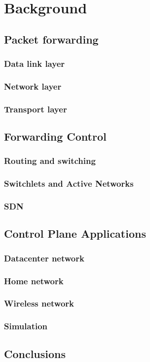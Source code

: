 \chapter{Background} \label{ch:background}
\ifpdf
    \graphicspath{{Background/BackgroundFigs/PNG/}{Chapter3/BackgroundFigs/PDF/}{Background/BackgroundFigs/}}
\else
    \graphicspath{{Background/BackgroundFigs/EPS/}{Background/BackgroundFigs/}}
\fi

\section{Packet forwarding}
\subsection{Data link layer}
\subsection{Network layer}
\subsection{Transport layer}

\section{Forwarding Control}
\subsection{Routing and switching}
\subsection{Switchlets and Active Networks}
\subsection{SDN}

\section{Control Plane Applications}
\subsection{Datacenter network}
\subsection{Home network}
\subsection{Wireless network}
\subsection{Simulation}

\section{Conclusions}
